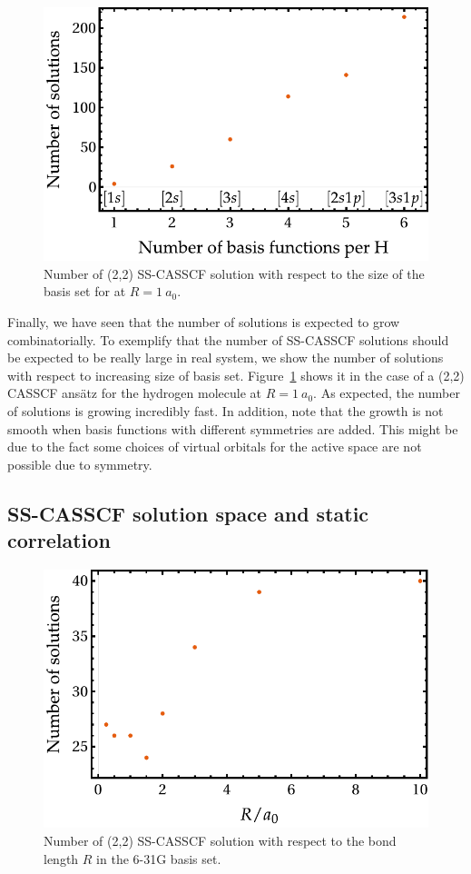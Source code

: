 \documentclass[aps,prb,reprint,showkeys,superscriptaddress]{revtex4-1}
\begin{document}
\begin{figure}
  \includegraphics[width=0.9\linewidth]{Figures/fig_2a.pdf}
  \caption{Number of (2,2) SS-CASSCF solution with respect to the size of the basis set for  at $R=1~a_0$. \label{fig:fig_4}}
\end{figure}

Finally, we have seen that the number of solutions is expected to grow combinatorially.
To exemplify that the number of SS-CASSCF solutions should be expected to be really large in real system, we show the number of solutions with respect to increasing size of basis set.
Figure~\ref{fig:fig_4} shows it in the case of a (2,2) CASSCF ans\"atz for the hydrogen molecule at $R=1~a_0$.
As expected, the number of solutions is growing incredibly fast.
In addition, note that the growth is not smooth when basis functions with different symmetries are added.
This might be due to the fact some choices of virtual orbitals for the active space are not possible due to symmetry.

\subsection{SS-CASSCF solution space and static correlation}
\label{sec:static}

\begin{figure}
  \includegraphics[width=0.9\linewidth]{Figures/fig_2b.pdf}
  \caption{Number of (2,2) SS-CASSCF solution with respect to the  bond length $R$ in the 6-31G basis set. \label{fig:fig_5}}
\end{figure}
\end{document}
